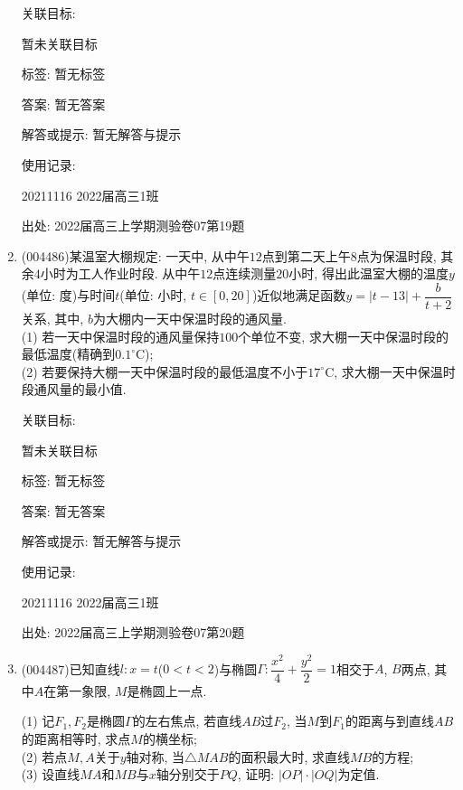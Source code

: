 \documentclass[10pt,a4paper]{article}
\begin{document}
\begin{enumerate}[1.]
关联目标:

暂未关联目标



标签: 暂无标签

答案: 暂无答案

解答或提示: 暂无解答与提示

使用记录:

20211116	2022届高三1班		


出处: 2022届高三上学期测验卷07第19题
\item { (004486)}某温室大棚规定: 一天中, 从中午$12$点到第二天上午$8$点为保温时段, 其余$4$小时为工人作业时段. 从中午$12$点连续测量$20$小时, 得出此温室大棚的温度$y$(单位: 度)与时间$t$(单位: 小时, $t\in [0,20]$)近似地满足函数$y=|t-13|+\dfrac b{t+2}$关系, 其中, $b$为大棚内一天中保温时段的通风量.\\
(1) 若一天中保温时段的通风量保持$100$个单位不变, 求大棚一天中保温时段的最低温度(精确到$0.1^\circ\text{C}$);\\
(2) 若要保持大棚一天中保温时段的最低温度不小于$17^\circ\text{C}$, 求大棚一天中保温时段通风量的最小值.


关联目标:

暂未关联目标



标签: 暂无标签

答案: 暂无答案

解答或提示: 暂无解答与提示

使用记录:

20211116	2022届高三1班			


出处: 2022届高三上学期测验卷07第20题
\item { (004487)}已知直线$l:x=t$($0<t<2$)与椭圆$\Gamma:\dfrac{x^2}4+\dfrac{y^2}2=1$相交于$A$, $B$两点, 其中$A$在第一象限, $M$是椭圆上一点.
\begin{center}
\end{center}
(1) 记$F_1,F_2$是椭圆$\Gamma$的左右焦点, 若直线$AB$过$F_2$, 当$M$到$F_1$的距离与到直线$AB$的距离相等时, 求点$M$的横坐标;\\
(2) 若点$M,A$关于$y$轴对称, 当$\triangle MAB$的面积最大时, 求直线$MB$的方程;\\
(3) 设直线$MA$和$MB$与$x$轴分别交于$PQ$, 证明: $|OP|\cdot |OQ|$为定值.



\end{enumerate}
\end{document}
